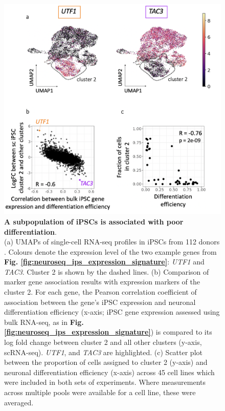 \begin{figure}[htbp]
\centering
\includegraphics[width=14cm]{Chapter5/Fig/neuroseq_ips_sc_genes.png}
\caption[An iPSC subpopulation is linked to poor differentiation]{\textbf{A subpopulation of iPSCs is associated with poor differentiation}.\\
(a) UMAPs of single-cell RNA-seq profiles in iPSCs from 112 donors \cite{cuomo2020single}.
Colours denote the expression level of the two example genes from \textbf{Fig. \ref{fig:neuroseq_ips_expression_signature}}: \textit{UTF1} and \textit{TAC3}. 
Cluster 2 is shown by the dashed lines. 
(b) Comparison of marker gene association results with expression markers of the cluster 2. 
For each gene, the Pearson correlation coefficient of association between the gene's iPSC expression and neuronal differentiation efficiency (x-axis; iPSC gene expression assessed using bulk RNA-seq, as in \textbf{Fig. \ref{fig:neuroseq_ips_expression_signature}}) is compared to its log fold change between cluster 2 and all other clusters (y-axis, scRNA-seq).
\textit{UTF1}, and \textit{TAC3} are highlighted. 
(c) Scatter plot between the proportion of cells assigned to cluster 2 (y-axis) and neuronal differentiation efficiency (x-axis) across 45 cell lines which were included in both sets of experiments. 
Where measurements across multiple pools were available for a cell line, these were averaged.}
\label{fig:neuroseq_ips_sc_genes}
\end{figure}


